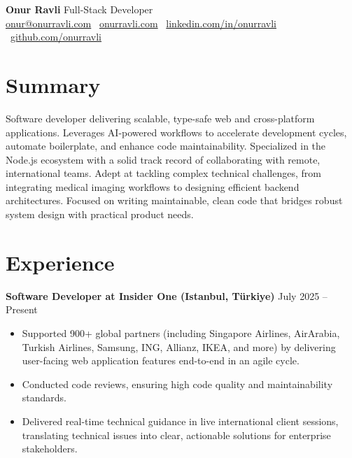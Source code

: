 \documentclass[10pt,a4paper]{extarticle}
\begin{document}
\begin{center}
    \begin{minipage}{\textwidth}
        \centering
        {\LARGE\textbf{Onur Ravli}} \hspace{2pt} {\LARGE{Full-Stack Developer}}\\[5pt]
        \href{mailto:onur@onurravli.com}{onur@onurravli.com} \textbullet\
        \href{https://onurravli.com}{onurravli.com} \textbullet\
        \href{https://linkedin.com/in/onurravli}{linkedin.com/in/onurravli} \textbullet\
        \href{https://github.com/onurravli}{github.com/onurravli}
    \end{minipage}
\end{center}

\section{Summary}
Software developer delivering scalable, type-safe web and cross-platform applications. Leverages AI-powered workflows to accelerate development cycles, automate boilerplate, and enhance code maintainability. Specialized in the Node.js ecosystem with a solid track record of collaborating with remote, international teams. Adept at tackling complex technical challenges, from integrating medical imaging workflows to designing efficient backend architectures. Focused on writing maintainable, clean code that bridges robust system design with practical product needs.

\section{Experience}
\noindent\textbf{Software Developer at Insider One (Istanbul, Türkiye)} \hfill July 2025 -- Present
\begin{itemize}[leftmargin=*,noitemsep,topsep=0pt]
    \item Supported 900+ global partners (including Singapore Airlines, AirArabia, Turkish Airlines, Samsung, ING, Allianz, IKEA, and more) by delivering user-facing web application features end-to-end in an agile cycle.
    \item Conducted code reviews, ensuring high code quality and maintainability standards.
    \item Delivered real-time technical guidance in live international client sessions, translating technical issues into clear, actionable solutions for enterprise stakeholders.
\end{itemize}
\end{document}
